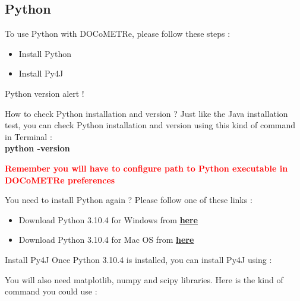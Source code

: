 \documentclass[a4paper,11pt]{beamer}
\begin{document}
\subsection{Python}
\begin{frame}
\begin{block}{To use Python with DOCoMETRe, please follow these steps :}
	\begin{itemize}
		\item Install Python
		\item Install Py4J
	\end{itemize}
\end{block}
\end{frame}

\begin{frame}

\begin{alertblock}{Python version alert !}
\end{alertblock}

\begin{exampleblock}{How to check Python installation and version ?}
\center
Just like the Java installation test, you can check Python installation and version using this kind of command in Terminal :\\
 \textbf{python -version}
\end{exampleblock}
\vspace{1cm}
\centering
    \textcolor{red}{\textbf{Remember you will have to configure path to Python executable in DOCoMETRe preferences}}
\end{frame}

\begin{frame}
\begin{block}{You need to install Python again ?}
Please follow one of these links :
\begin{itemize}
\item Download Python 3.10.4 for Windows from \textcolor{blue}{\textbf{\underline{\href{http://www.ism.univ-amu.fr/buloup/documents/PYTHON/python-3.10.4-amd64.exe}{here}}}}
\item Download Python 3.10.4 for Mac OS from \textcolor{blue}{\textbf{\underline{\href{http://www.ism.univ-amu.fr/buloup/documents/PYTHON/python-3.10.4-macos11.pkg}{here}}}}
\end{itemize}
\end{block}

\begin{exampleblock}{Install Py4J}
\justifying Once Python 3.10.4 is installed, you can install Py4J using : 
\linebreak

\justifying You will also need matplotlib, numpy and scipy libraries. Here is the kind of command you could use :
\end{exampleblock}

\end{frame}
\end{document}
